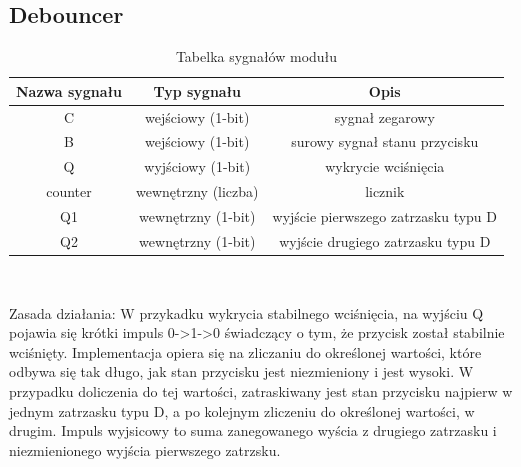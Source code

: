 \documentclass{article}
\begin{document}
\subsection{Debouncer}
\begin{table}[h]
    \centering
    \begin{tabular}{|c|c|c|}
        \hline
        Nazwa sygnału & Typ sygnału & Opis \\
        \hline
        C  & wejściowy (1-bit)    & sygnał zegarowy    \\
        \hline
        B  & wejściowy (1-bit)   & surowy sygnał stanu przycisku    \\
        \hline
        Q  & wyjściowy (1-bit)   & wykrycie wciśnięcia    \\
        \hline
        counter  & wewnętrzny (liczba)    & licznik     \\
        \hline
        Q1  & wewnętrzny (1-bit) & wyjście pierwszego zatrzasku typu D   \\
        \hline
        Q2  & wewnętrzny (1-bit)  & wyjście drugiego zatrzasku typu D\\
        \hline
    \end{tabular}\\
    \caption{Tabelka sygnałów modułu}
    \label{tab:tabela1}
\end{table}
Zasada działania: W przykadku wykrycia stabilnego wciśnięcia, na wyjściu Q pojawia się krótki impuls 0->1->0 świadczący o tym, że 
    przycisk został stabilnie wciśnięty. Implementacja opiera się na zliczaniu do określonej wartości, które odbywa się tak długo, jak stan 
    przycisku jest niezmieniony i jest wysoki. W przypadku doliczenia do tej wartości, zatraskiwany jest stan przycisku najpierw w jednym zatrzasku typu D, a po
    kolejnym zliczeniu do określonej wartości, w drugim. Impuls wyjsicowy to suma zanegowanego wyścia z drugiego zatrzasku i niezmienionego wyjścia pierwszego zatrzsku.
\end{document}
